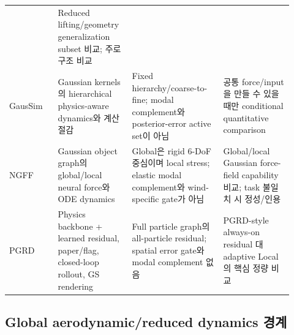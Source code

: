 \documentclass[11pt,a4paper]{article}
\begin{document}
\begin{longtable}{L{0.16\linewidth}L{0.23\linewidth}L{0.30\linewidth}L{0.23\linewidth}}
& Reduced lifting/geometry generalization subset 비교; 주로 구조 비교 \\
\addlinespace
GausSim \cite{shao2025gausim}
& Gaussian kernels의 hierarchical physics-aware dynamics와 계산 절감
& Fixed hierarchy/coarse-to-fine; modal complement와 posterior-error active set이 아님
& 공통 force/input을 만들 수 있을 때만 conditional quantitative comparison \\
\addlinespace
NGFF \cite{li2026ngff}
& Gaussian object graph의 global/local neural force와 ODE dynamics
& Global은 rigid 6-DoF 중심이며 local stress; elastic modal complement와 wind-specific gate가 아님
& Global/local Gaussian force-field capability 비교; task 불일치 시 정성/인용 \\
\addlinespace
PGRD \cite{patel2026pgrd}
& Physics backbone + learned residual, paper/flag, closed-loop rollout, GS rendering
& Full particle graph의 all-particle residual; spatial error gate와 modal complement 없음
& PGRD-style always-on residual 대 adaptive Local의 핵심 정량 비교 \\
\bottomrule
\end{longtable}

\subsection{Global aerodynamic/reduced dynamics 경계}
\end{document}
